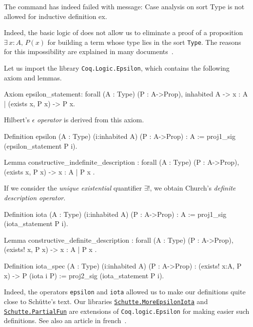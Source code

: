 \begin{Coqanswer}
The command has indeed failed with message:
Case analysis on sort Type is not allowed for inductive 
definition ex.
\end{Coqanswer}


Indeed, the basic logic of  \coq{} does not allow us to eliminate a proof of a proposition 
$\exists\,x:A,\,P(x)$ for building a term whose type lies in the sort \texttt{Type}. 
The reasons for this impossibility are explained in many documents~\cite{BC04, chlipalacpdt2011, Coq}.

Let us import the library \texttt{Coq.Logic.Epsilon}, which contains the following axiom and lemmas.


\begin{Coqsrc}
Axiom epsilon_statement:
  forall (A : Type) (P : A->Prop), inhabited A ->
    {x : A | (exists x, P x) -> P x}.
\end{Coqsrc}

Hilbert's $\epsilon$ \emph{operator} is derived from this  axiom.

\begin{Coqsrc}
  Definition epsilon (A : Type) (i:inhabited A) (P : A->Prop) : A
  := proj1_sig (epsilon_statement P i).

Lemma constructive_indefinite_description :
  forall (A : Type) (P : A->Prop),
    (exists x, P x) -> { x : A | P x }.
\end{Coqsrc}




If we consider the \emph{unique existential} quantifier $\exists!$, we obtain
Church's \emph{definite description operator}.

\begin{Coqsrc}
Definition iota (A : Type) (i:inhabited A) (P : A->Prop) : A
  := proj1_sig (iota_statement P i).
\end{Coqsrc}


\begin{Coqsrc}
 Lemma constructive_definite_description :
  forall (A : Type) (P : A->Prop),
    (exists! x, P x) -> { x : A | P x }.
\end{Coqsrc}


\begin{Coqsrc}
Definition iota_spec (A : Type) (i:inhabited A) (P : A->Prop) :
  (exists! x:A, P x) -> P (iota i P)
  := proj2_sig (iota_statement P i).
\end{Coqsrc}



Indeed, the operators \texttt{epsilon} and \texttt{iota} allowed us to make our definitions 
quite close to Schütte's text. Our libraries \href{../theories/html/hydras.Schutte.MoreEpsilonIota.html}%
{\texttt{Schutte.MoreEpsilonIota}}
and
\href{../theories/html/hydras.Schutte.PartialFun.html}%
{\texttt{Schutte.PartialFun}} are extensions of \texttt{Coq.logic.Epsilon} for making easier 
such definitions. See also an article in french~\cite{PCiota}. 




